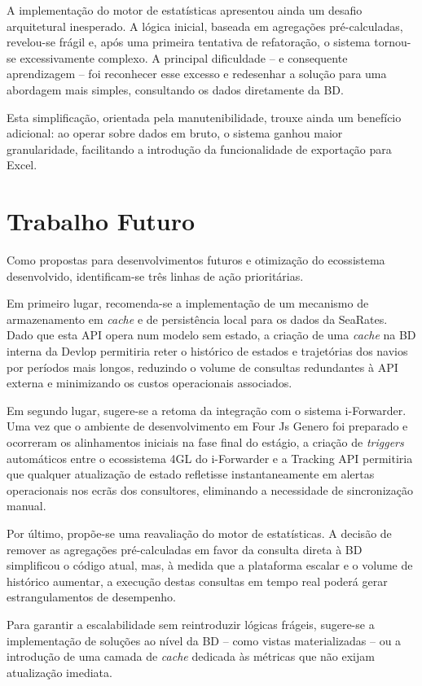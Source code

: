\documentclass[a4paper,12pt]{report}
\begin{document}
A implementação do motor de estatísticas apresentou ainda um desafio arquitetural inesperado. A lógica inicial, baseada em agregações pré-calculadas, revelou-se frágil e, após uma primeira tentativa de refatoração, o sistema tornou-se excessivamente complexo. A principal dificuldade -- e consequente aprendizagem -- foi reconhecer esse excesso e redesenhar a solução para uma abordagem mais simples, consultando os dados diretamente da BD.

Esta simplificação, orientada pela manutenibilidade, trouxe ainda um benefício adicional: ao operar sobre dados em bruto, o sistema ganhou maior granularidade, facilitando a introdução da funcionalidade de exportação para Excel.

\section{Trabalho Futuro}

Como propostas para desenvolvimentos futuros e otimização do ecossistema desenvolvido, identificam-se três linhas de ação prioritárias.

Em primeiro lugar, recomenda-se a implementação de um mecanismo de armazenamento em \textit{cache} e de persistência local para os dados da SeaRates. Dado que esta API opera num modelo sem estado, a criação de uma \textit{cache} na BD interna da Devlop permitiria reter o histórico de estados e trajetórias dos navios por períodos mais longos, reduzindo o volume de consultas redundantes à API externa e minimizando os custos operacionais associados.

Em segundo lugar, sugere-se a retoma da integração com o sistema i-Forwarder. Uma vez que o ambiente de desenvolvimento em Four Js Genero foi preparado e ocorreram os alinhamentos iniciais na fase final do estágio, a criação de \textit{triggers} automáticos entre o ecossistema 4GL do i-Forwarder e a Tracking API permitiria que qualquer atualização de estado refletisse instantaneamente em alertas operacionais nos ecrãs dos consultores, eliminando a necessidade de sincronização manual.

Por último, propõe-se uma reavaliação do motor de estatísticas. A decisão de remover as agregações pré-calculadas em favor da consulta direta à BD simplificou o código atual, mas, à medida que a plataforma escalar e o volume de histórico aumentar, a execução destas consultas em tempo real poderá gerar estrangulamentos de desempenho.

Para garantir a escalabilidade sem reintroduzir lógicas frágeis, sugere-se a implementação de soluções ao nível da BD -- como vistas materializadas -- ou a introdução de uma camada de \textit{cache} dedicada às métricas que não exijam atualização imediata.
\end{document}
